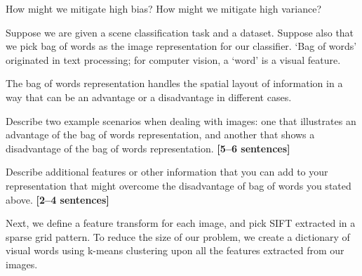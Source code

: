 \documentclass{csci1430}
\begin{document}
\begin{answer}[height=8]

\end{answer}
    

\begin{subquestion}[points=2]
How might we mitigate high bias?
How might we mitigate high variance?
\end{subquestion}
    
\begin{answer}[height=8]

\end{answer}


\pagebreak
\begin{question}[points=12,drawbox=false] 
Suppose we are given a scene classification task and a dataset. Suppose also that we pick bag of words as the image representation for our classifier. `Bag of words' originated in text processing; for computer vision, a `word' is a visual feature.

The bag of words representation handles the spatial layout of information in a way that can be an advantage or a disadvantage in different cases.
\end{question}

\begin{subquestion}[points=2]
Describe two example scenarios when dealing with images: one that illustrates an advantage of the bag of words representation, and another that shows a disadvantage of the bag of words representation. \textbf{[5--6 sentences]}
\end{subquestion}

\begin{answer}[height=12]

\end{answer}


\begin{subquestion}[points=1]
Describe additional features or other information that you can add to your representation that might overcome the disadvantage of bag of words you stated above. \textbf{[2--4 sentences]}
\end{subquestion}

\begin{answer}[height=8]

\end{answer}


\pagebreak
Next, we define a feature transform for each image, and pick SIFT extracted in a sparse grid pattern. To reduce the size of our problem, we create a dictionary of visual words using k-means clustering upon all the features extracted from our images.
\end{document}
